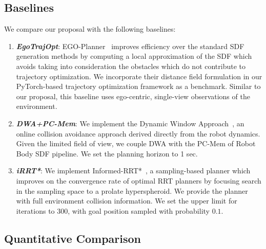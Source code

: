 \documentclass[letterpaper, 10 pt, conference]{ieeeconf}  %
\begin{document}
\subsection{Baselines}

We compare our proposal with the following baselines:
\begin{enumerate}
    \item \textbf{\emph{EgoTrajOpt}}: EGO-Planner~\cite{zhou2020ego} improves efficiency over the standard SDF generation methods by computing a local approximation of the SDF which avoids taking into consideration the obstacles which do not contribute to trajectory optimization.
    We incorporate their distance field formulation in our PyTorch-based trajectory optimization framework as a benchmark.
    Similar to our proposal, this baseline uses ego-centric, single-view observations of the environment.
    \item \textbf{\emph{DWA+PC-Mem}}: We implement the Dynamic Window Approach~\cite{dwa97}, an online collision avoidance approach derived directly from the robot dynamics.
    Given the limited field of view, we couple DWA with the PC-Mem of Robot Body SDF pipeline.
    We set the planning horizon to 1 sec.
    \item \textbf{\emph{iRRT*}}: We implement Informed-RRT*~\cite{gammell2014informed}, a sampling-based planner which improves on the convergence rate of optimal RRT planners by focusing search in the sampling space to a prolate hyperspheroid.
    We provide the planner with full environment collision information.
    We set the upper limit for iterations to 300, with goal position sampled with probability $0.1$.
\end{enumerate}

\subsection{Quantitative Comparison}
\end{document}
